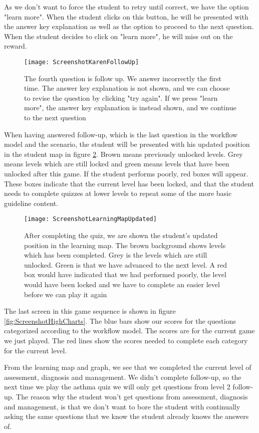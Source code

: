 As we don't want to force the student to retry until correct, we have the option "learn more". When the student clicks on this button, he will be presented with the answer key explanation as well as the option to proceed to the next question. When the student decides to click on "learn more", he will miss out on the reward.

\begin{figure}[h!]
	\label{fig:ScreenshotKarenFollowUp}
	\texttt{[image: ScreenshotKarenFollowUp]}
	\caption {The fourth question is follow up. We answer incorrectly the first time. The answer key explanation is not shown, and we can choose to revise the question by clicking "try again". If we press "learn more", the answer key explanation is instead shown, and we continue to the next question}
\end{figure}

When having answered follow-up, which is the last question in the workflow model and the scenario, the student will be presented with his updated position in the student map in figure \ref{fig:ScreenshotLearningMapUpdated}. Brown means previously unlocked levels. Grey means levels which are still locked and green means levels that have been unlocked after this game. If the student performs poorly, red boxes will appear. These boxes indicate that the current level has been locked, and that the student needs to complete quizzes at lower levels to repeat some of the more basic guideline content.

\begin{figure}[h!]
	\label{fig:ScreenshotLearningMapUpdated}
	\texttt{[image: ScreenshotLearningMapUpdated]}
	\caption {After completing the quiz, we are shown the student's updated position in the learning map. The brown background shows levels which has been completed. Grey is the levels which are still unlocked. Green is that we have advanced to the next level. A red box would have indicated that we had performed poorly, the level would have been locked and we have to complete an easier level before we can play it again}
\end{figure}

The last screen in this game sequence is shown in figure \ref{fig:ScreenshotHighCharts}. The blue bars show our scores for the questions categorized according to the workflow model. The scores are for the current game we just played. The red lines show the scores needed to complete each category for the current level.

From the learning map and graph, we see that we completed the current level of assessment, diagnosis and management. We didn't complete follow-up, so the next time we play the asthma quiz we will only get questions from level 2 follow-up. The reason why the student won't get questions from assessment, diagnosis and management, is that we don't want to bore the student with continually asking the same questions that we know the student already knows the answers of.

